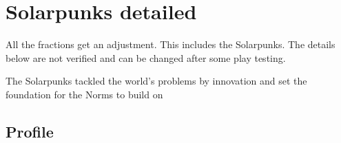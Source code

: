 \chapter {Solarpunks detailed}


\begin{warning}
    All the fractions get an adjustment. This includes the Solarpunks. The details below are not verified and can be changed after some play testing.

\end{warning}

The Solarpunks tackled the world's problems by innovation and set the foundation for the Norms to build on

\section{Profile}
